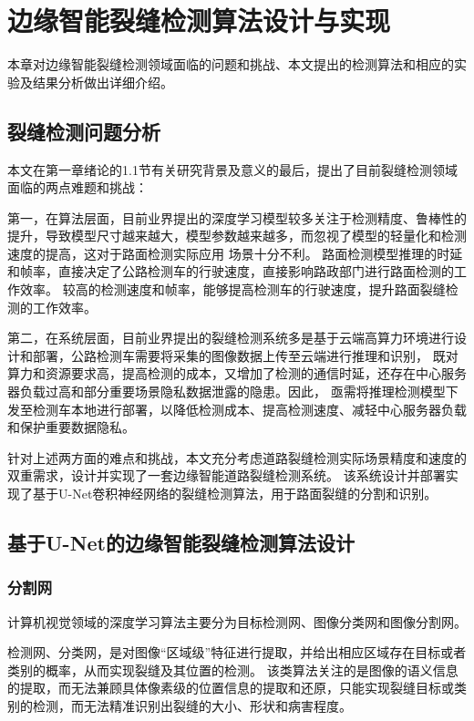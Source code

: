 \chapter{边缘智能裂缝检测算法设计与实现}
本章对边缘智能裂缝检测领域面临的问题和挑战、本文提出的检测算法和相应的实验及结果分析做出详细介绍。

\section{裂缝检测问题分析}
本文在第一章绪论的1.1节有关研究背景及意义的最后，提出了目前裂缝检测领域面临的两点难题和挑战：

第一，在算法层面，目前业界提出的深度学习模型较多关注于检测精度、鲁棒性的提升，导致模型尺寸越来越大，模型参数越来越多，而忽视了模型的轻量化和检测速度的提高，这对于路面检测实际应用
场景十分不利。
路面检测模型推理的时延和帧率，直接决定了公路检测车的行驶速度，直接影响路政部门进行路面检测的工作效率。
较高的检测速度和帧率，能够提高检测车的行驶速度，提升路面裂缝检测的工作效率。

第二，在系统层面，目前业界提出的裂缝检测系统多是基于云端高算力环境进行设计和部署，公路检测车需要将采集的图像数据上传至云端进行推理和识别，
既对算力和资源要求高，提高检测的成本，又增加了检测的通信时延，还存在中心服务器负载过高和部分重要场景隐私数据泄露的隐患。因此，
亟需将推理检测模型下发至检测车本地进行部署，以降低检测成本、提高检测速度、减轻中心服务器负载和保护重要数据隐私。

针对上述两方面的难点和挑战，本文充分考虑道路裂缝检测实际场景精度和速度的双重需求，设计并实现了一套边缘智能道路裂缝检测系统。
该系统设计并部署实现了基于U-Net卷积神经网络的裂缝检测算法，用于路面裂缝的分割和识别。

\section{基于U-Net的边缘智能裂缝检测算法设计}

\subsection{分割网}
计算机视觉领域的深度学习算法主要分为目标检测网、图像分类网和图像分割网。

检测网、分类网，是对图像“区域级”特征进行提取，并给出相应区域存在目标或者类别的概率，从而实现裂缝及其位置的检测。
该类算法关注的是图像的语义信息的提取，而无法兼顾具体像素级的位置信息的提取和还原，只能实现裂缝目标或类别的检测，而无法精准识别出裂缝的大小、形状和病害程度。

